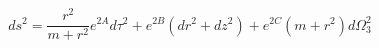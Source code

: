 \begin{equation}
ds^2 = \frac{r^2}{m + r^2} e^{2 A} d\tau^2 + e^{2 B} ( dr^2 + dz^2 ) + e^{2 C}
( m + r^2 ) d\Omega^2_{3}
\label{eq:num_metric}
\end{equation}

